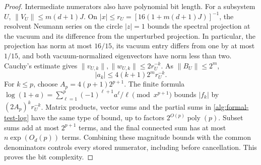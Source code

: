 \documentclass[reqno]{amsart}
\theoremstyle{definition}
\theoremstyle{remark}
\begin{document}
\begin{proof}
Intermediate numerators also have polynomial bit length.
For a subsystem \(U\), \(\|V_U\|\le m(d+1)J\).
On \(|x|\le r_U=[16(1+m(d+1)J)]^{-1}\), the resolvent
Neumann series on the circle \(|z|=1\) bounds the spectral
projection at the vacuum and its difference from the
unperturbed projection.  In particular, the projection has
norm at most \(16/15\), its vacuum entry differs from one by
at most \(1/15\), and both vacuum-normalized eigenvectors have
norm less than two.  Cauchy's estimate gives
\(\|v_{U,k}\|,\|w_{U,k}\|\le2r_U^{-k}\).
As \(\|B_U\|\le2^m\),
\[
 |a_k|\le4(k+1)2^m r_U^{-k}.
\]
For \(k\le p\), choose \(A_p=4(p+1)2^{p+1}\).
The finite formula
\(\log(1+a)=\sum_{\ell=1}^p(-1)^{\ell+1}a^\ell/\ell
 \pmod{x^{p+1}}\)
bounds \(|f_k|\) by \((2A_p)^kr_U^{-k}\).
Matrix products, vector sums and the partial sums in
\eqref{alg:formal-test-log} have the same type of bound, up to
factors \(2^{O(p)}\operatorname{poly}(p)\).
Subset sums add at most \(2^{p+1}\) terms, and the final
connected sum has at most \(n\exp(O_d(p))\) terms.
Combining these magnitude bounds with the common denominators
controls every stored numerator, including before cancellation.
This proves the bit complexity.
\end{proof}
\end{document}
